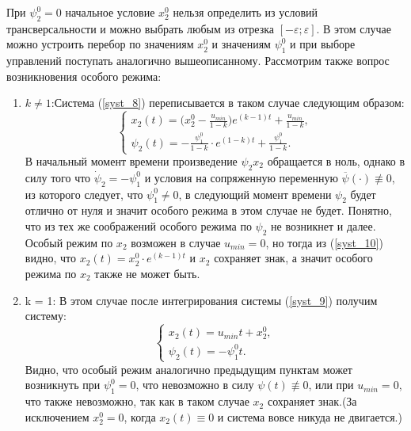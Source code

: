 \documentclass[10pt]{article}
\begin{document}
	При \( \psi_2^0 = 0 \) начальное условие \( x_2^0 \) нельзя определить из условий трансверсальности и можно выбрать любым из отрезка \( [-\varepsilon; \varepsilon] \). В этом случае можно устроить перебор по значениям \( x_2^0 \) и значениям \( \psi_1^0 \) и при выборе управлений поступать аналогично вышеописанному. Рассмотрим также вопрос возникновения особого режима:
\begin{enumerate}
	\item \( k \ne 1 \):Система (\ref{syst_8}) переписывается в таком случае следующим образом:
	\begin{equation} \label{syst_10}
		\begin{cases}
			x_2(t) = \big(x_2^0 - \frac{u_{min}}{1 - k} \big) e^{(k-1)t} + \frac{u_{min}}{1 - k},
			\\
			\psi_2(t) = - \frac{\psi_1^0}{1- k} \cdot e^{(1 - k)t}+\frac{\psi_1^0}{1 - k}.
		\end{cases}
	\end{equation}
	В начальный момент времени произведение \( \psi_2 x_2 \) обращается в ноль, однако в силу того что \( \dot{\psi}_2 = -\psi_1^0 \) и условия на сопряженную переменную \( \overline{\psi}(\cdot)  \not\equiv 0 \), из которого следует, что \( \psi_1^0 \ne 0 \), в следующий момент времени \( \psi_2 \) будет отлично от нуля и значит особого режима в этом случае не будет. Понятно, что из тех же соображений особого режима по \( \psi_2 \) не возникнет и далее. Особый режим по \( x_2 \) возможен в случае \( u_{min} = 0 \), но тогда из (\ref{syst_10}) видно, что  \( x_2(t) = x_2^0 \cdot e^{(k-1)t} \) и \( x_2 \) сохраняет знак, а значит особого режима по \( x_2 \) также не может быть.
	\item k = 1: 
		В этом случае после интегрирования системы (\ref{syst_9}) получим систему:
		\[ \begin{cases}
			x_2(t) = u_{min} t + x_2^0,
			\\
			\psi_2(t) = - \psi_1^0 t.
		\end{cases} \]
 	Видно, что особый режим аналогично предыдущим пунктам может возникнуть при \( \psi_1^0 = 0 \), что невозможно в силу \( \psi(t) \not\equiv 0\), или при \( u_{min} = 0 \), что также невозможно, так как в таком случае \( x_2 \) сохраняет знак.(За исключением \(x_2^0 = 0 \), когда \( x_2(t) \equiv 0 \) и система вовсе никуда не двигается.)
\end{enumerate}
\end{document}
